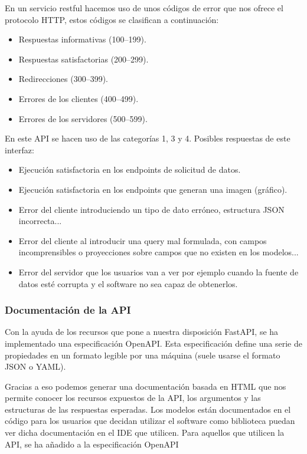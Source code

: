 En un servicio restful hacemos uso de unos códigos de error que nos ofrece el protocolo
HTTP, estos códigos se clasifican a continuación:
\begin{itemize}
    \item Respuestas informativas (100–199).
    \item Respuestas satisfactorias (200–299).
    \item Redirecciones (300–399).
    \item Errores de los clientes (400–499).
    \item Errores de los servidores (500–599).
\end{itemize}

En este API se hacen uso de las categorías 1, 3 y 4. Posibles respuestas de este interfaz:
\begin{itemize}
    \item {} Ejecución satisfactoria en los endpoints de solicitud de datos.
    \item {} Ejecución satisfactoria en los endpoints que generan una imagen
    (gráfico).
    \item {} Error del cliente introduciendo un tipo de dato erróneo,
    estructura JSON incorrecta...
    \item {} Error del cliente al introducir una query mal formulada, con
    campos incomprensibles o proyecciones sobre campos que no existen en los modelos...
    \item {} Error del servidor que los usuarios van a ver por ejemplo cuando
    la fuente de datos esté corrupta y el software no sea capaz de obtenerlos.
\end{itemize}

\subsubsection{Documentación de la API}
Con la ayuda de los recursos que pone a nuestra disposición FastAPI, se ha implementado
una especificación OpenAPI. Esta especificación define una serie de propiedades en un
formato legible por una máquina (suele usarse el formato JSON o YAML).

Gracias a eso podemos generar una documentación basada en HTML que nos permite conocer los
recursos expuestos de la API, los argumentos y las estructuras de las respuestas
esperadas. Los modelos están documentados en el código para los usuarios que decidan
utilizar el software como biblioteca puedan ver dicha documentación en el IDE que
utilicen. Para aquellos que utilicen la API, se ha añadido a la especificación OpenAPI

